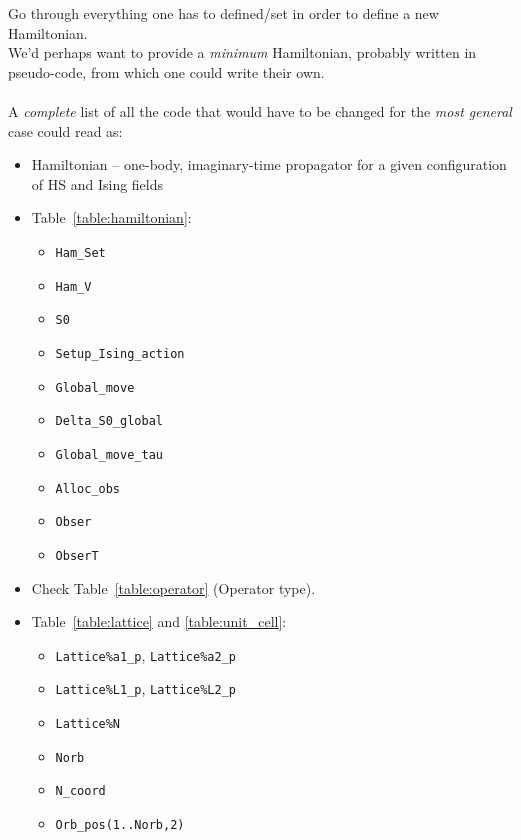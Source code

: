   Go through everything one has to defined/set in order to define a new Hamiltonian. \\

We'd perhaps want to provide a \emph{minimum} Hamiltonian, probably written in pseudo-code, from which one could write their own.\\ \\

\noindent A \emph{complete} list of all the code that would have to be changed for the \emph{most general} case could read as:

\begin{itemize}
	\item Hamiltonian -- one-body, imaginary-time propagator for a given configuration of HS and  Ising fields
	\item Table~\ref{table:hamiltonian}:
	\begin{itemize}
		\item \texttt{Ham\_Set}
		\item \texttt{Ham\_V}
		\item \texttt{S0}
		\item \texttt{Setup\_Ising\_action}
		\item \texttt{Global\_move}
		\item \texttt{Delta\_S0\_global}
		\item \texttt{Global\_move\_tau}
		\item \texttt{Alloc\_obs}
		\item \texttt{Obser}
		\item \texttt{ObserT}
	\end{itemize}
	\item Check Table~\ref{table:operator} (Operator type).
	\item Table~\ref{table:lattice} and \ref{table:unit_cell}:
	\begin{itemize}
		\item \texttt{Lattice\%a1\_p}, \texttt{Lattice\%a2\_p}
		\item \texttt{Lattice\%L1\_p}, \texttt{Lattice\%L2\_p}
		\item \texttt{Lattice\%N}
		\item \texttt{Norb}
		\item \texttt{N\_coord}
		\item \texttt{Orb\_pos(1..Norb,2)}
	\end{itemize}
\end{itemize}

